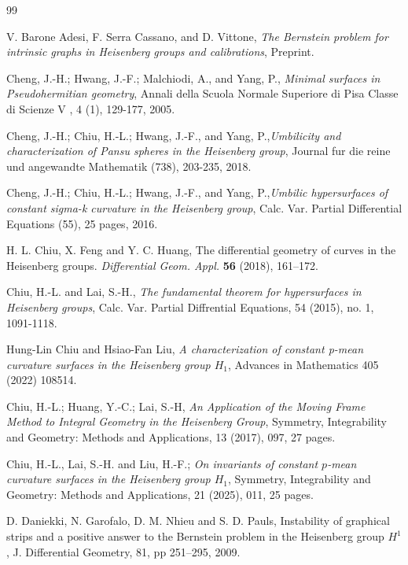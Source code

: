 \documentclass[12pt]{amsart}
\theoremstyle{definition}\newtheorem{exa}[thm]{\sc Example}
\theoremstyle{definition}\newtheorem{de}[thm]{\sc Definition}
\theoremstyle{definition}\newtheorem{rem}[thm]{\sc Remark}
\theoremstyle{definition}\newtheorem{prob}[thm]{\it Problem}
\theoremstyle{definition}\newtheorem{fact}[thm]{\sc Fact}
\theoremstyle{definition}\newtheorem{claim}[thm]{\sc Claim}
\numberwithin{equation}{section}
\begin{document}
%

\begin{thebibliography}{99}

 V. Barone Adesi, F. Serra Cassano, and D. Vittone, {\it The Bernstein problem for intrinsic graphs in Heisenberg groups and calibrations},  Preprint.

 Cheng, J.-H.; Hwang, J.-F.; Malchiodi, A., and Yang, P., {\it Minimal surfaces in Pseudohermitian geometry},  Annali della Scuola Normale Superiore di Pisa Classe di Scienze V , 4 (1), 129-177, 2005.

 Cheng, J.-H.; Chiu, H.-L.; Hwang, J.-F., and Yang, P.,{\it Umbilicity and characterization of Pansu spheres in the Heisenberg group}, Journal fur die reine und angewandte Mathematik (738), 203-235, 2018.

 Cheng, J.-H.; Chiu, H.-L.; Hwang, J.-F., and Yang, P.,{\it Umbilic hypersurfaces of constant sigma-k curvature in the Heisenberg group}, Calc. Var. Partial Differential Equations (55), 25 pages, 2016.

 H. L. Chiu, X. Feng and Y. C. Huang, The differential geometry of curves in the Heisenberg groups. \textit{Differential Geom. Appl.} \textbf{56} (2018), 161--172.

 Chiu, H.-L. and Lai, S.-H., {\it The fundamental theorem for hypersurfaces in Heisenberg groups}, Calc. Var. Partial Diffrential Equations, 54 (2015), no. 1, 1091-1118.

 Hung-Lin Chiu and Hsiao-Fan Liu, \textit{A characterization of constant p-mean curvature surfaces in the Heisenberg group $H_1$}, Advances in Mathematics 405 (2022) 108514.

 Chiu, H.-L.; Huang, Y.-C.; Lai, S.-H, {\it An Application of the Moving Frame Method to Integral Geometry in the Heisenberg Group},  Symmetry, Integrability and Geometry: Methods and Applications, 13 (2017), 097, 27 pages.

 Chiu, H.-L., Lai, S.-H. and Liu, H.-F.; {\it On invariants of constant $p$-mean curvature surfaces in the Heisenberg group $H_{1}$}, Symmetry, Integrability and Geometry: Methods and Applications, 21 (2025), 011, 25 pages.

 D. Daniekki, N. Garofalo, D. M. Nhieu and S. D. Pauls, {Instability of graphical strips and a positive answer to the Bernstein problem in the Heisenberg group $H^{1}$\it}, J. Differential Geometry, 81, pp 251--295, 2009.


\end{thebibliography}
\end{document}
